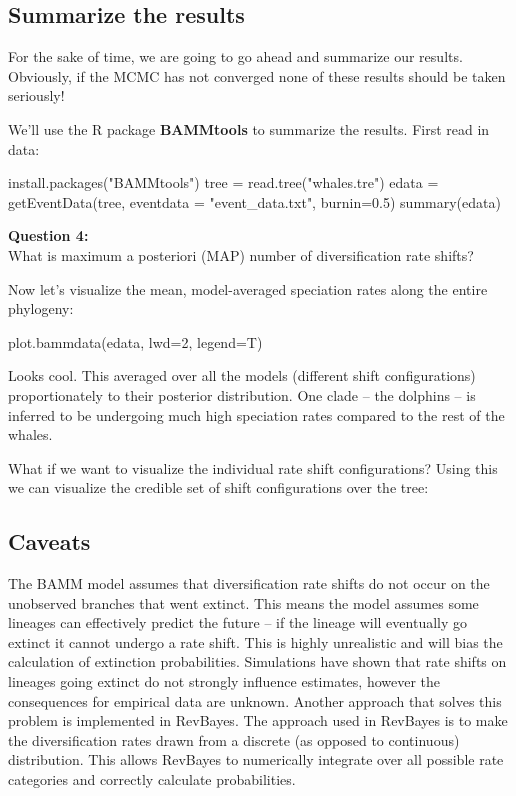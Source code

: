 \documentclass[11pt]{article}
\begin{document}
\subsection{Summarize the results}

For the sake of time, we are going to go ahead
and summarize our results.
Obviously, if the MCMC has not converged none
of these results should be taken seriously!

We'll use the R package \textbf{BAMMtools} \citep{rabosky2014bammtools}
to summarize the results. First read in data:
\begin{code}
install.packages("BAMMtools")
tree = read.tree("whales.tre")
edata = getEventData(tree, eventdata = "event_data.txt", burnin=0.5)
summary(edata)
\end{code}

\begin{framed}
\noindent
\textbf{Question 4:} \\
What is maximum a posteriori (MAP) number of diversification rate shifts?
\end{framed}

Now let's visualize the mean, model-averaged speciation rates 
along the entire phylogeny:
\begin{code}
plot.bammdata(edata, lwd=2, legend=T)
\end{code}
Looks cool. This averaged over all the 
models (different shift configurations) proportionately
to their posterior distribution.
One clade -- the dolphins -- is inferred to
be undergoing much high speciation rates compared
to the rest of the whales.


What if we want to visualize the individual rate
shift configurations?
Using this we can visualize the credible set of shift configurations over the tree:

\subsection{Caveats}

The BAMM model assumes that
diversification rate shifts do not occur
on the unobserved branches that went extinct.
This means the model assumes some lineages
can effectively predict the future -- if the lineage
will eventually go extinct it cannot undergo a rate shift.
This is highly unrealistic and will bias the calculation of extinction probabilities.
Simulations have shown that rate shifts on
lineages going extinct do not strongly
influence estimates, however the consequences
for empirical data are unknown.
Another approach that solves this
problem is implemented in RevBayes.
The approach used in RevBayes is to make
the diversification rates 
drawn from a discrete (as opposed to continuous)
distribution.
This allows RevBayes 
 to numerically
 integrate over all possible rate categories
 and correctly calculate probabilities.
\end{document}
